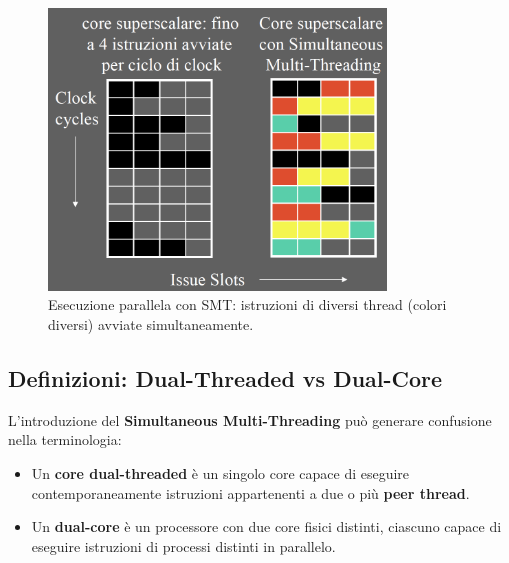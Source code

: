 \begin{figure}[h!]
    \centering
    \includegraphics[width=0.8\textwidth]{images/core_smt.png}
    \caption{Esecuzione parallela con SMT: istruzioni di diversi thread (colori diversi) avviate simultaneamente.}
\end{figure}


\subsection{Definizioni: Dual-Threaded vs Dual-Core}

L'introduzione del \textbf{Simultaneous Multi-Threading} può generare confusione nella terminologia:

\begin{itemize}
    \item Un \textbf{core dual-threaded} è un singolo core capace di eseguire contemporaneamente istruzioni appartenenti a due o più \textbf{peer thread}.
    \item Un \textbf{dual-core} è un processore con due core fisici distinti, ciascuno capace di eseguire istruzioni di processi distinti in parallelo. 
\end{itemize}



